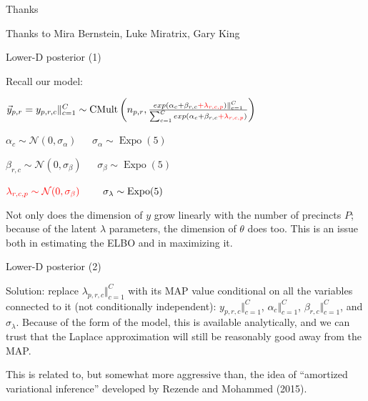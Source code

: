 \documentclass[ignorenonframetext,]{beamer}
\newcommand{\red}[1]{\textcolor{red}{#1}}
\begin{document}
\begin{frame}{Thanks}

Thanks to Mira Bernstein, Luke Miratrix, Gary King

\end{frame}

\begin{frame}{Lower-D posterior (1)}

Recall our model:

\(\vec{y}_{p,r}=y_{p,r,c}\Vert_{c=1}^C\sim \operatorname{CMult}\left(n_{p,r},\frac{exp(\alpha_c+\beta_{r,c}\red{+\lambda_{r,c,p}})\Vert_{c=1}^C}{\sum_{c=1}^Cexp(\alpha_c+\beta_{r,c}\red{+\lambda_{r,c,p}})}\right)\)

\(\alpha_c\sim\mathcal{N}(0,\sigma_\alpha)~~~~~~~\sigma_\alpha\sim\operatorname{Expo}(5)\)

\(\beta_{r,c}\sim\mathcal{N}(0,\sigma_\beta)~~~~~~~\sigma_\beta\sim\operatorname{Expo}(5)\)

\(\red{\lambda_{r,c,p}\sim\mathcal{N}(0,\sigma_\beta)}~~~~~~~\sigma_\lambda\sim\operatorname{Expo}(5)\)

Not only does the dimension of \(y\) grow linearly with the number of
precincts \(P\); because of the latent \(\lambda\) parameters, the
dimension of \(\theta\) does too. This is an issue both in estimating
the ELBO and in maximizing it.

\end{frame}

\begin{frame}{Lower-D posterior (2)}

Solution: replace \(\lambda_{p,r,c}\Vert_{c=1}^C\) with its MAP value
conditional on all the variables connected to it (not conditionally
independent): \(y_{p,r,c}\Vert_{c=1}^C\), \(\alpha_c\Vert_{c=1}^C\),
\(\beta_{r,c}\Vert_{c=1}^C\), and \(\sigma_\lambda\). Because of the
form of the model, this is available analytically, and we can trust that
the Laplace approximation will still be reasonably good away from the
MAP.

This is related to, but somewhat more aggressive than, the idea of
``amortized variational inference'' developed by Rezende and Mohammed
(2015).

\end{frame}
\end{document}
